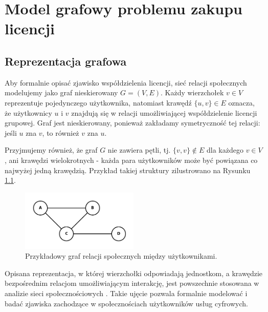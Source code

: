 \chapter{Model grafowy problemu zakupu licencji}

\section{Reprezentacja grafowa}

Aby formalnie opisać zjawisko współdzielenia licencji, sieć relacji społecznych modelujemy jako graf nieskierowany \( G = (V, E) \). Każdy wierzchołek \( v \in V \) reprezentuje pojedynczego użytkownika, natomiast krawędź \( \{u, v\} \in E \) oznacza, że użytkownicy \( u \) i \( v \) znajdują się w relacji umożliwiającej współdzielenie licencji grupowej. Graf jest nieskierowany, ponieważ zakładamy symetryczność tej relacji: jeśli \( u \) zna \( v \), to również \( v \) zna \( u \).

Przyjmujemy również, że graf \( G \) nie zawiera pętli, tj. \( \{v, v\} \notin E \) dla każdego \( v \in V \), ani krawędzi wielokrotnych - każda para użytkowników może być powiązana co najwyżej jedną krawędzią. Przykład takiej struktury zilustrowano na Rysunku \ref{fig:social_graph}.

\begin{figure}[H]
  \centering
  \includegraphics[width=0.5\textwidth]{assets/graphmodelexample.png}
  \caption{Przykładowy graf relacji społecznych między użytkownikami.}
  \label{fig:social_graph}
\end{figure}

Opisana reprezentacja, w której wierzchołki odpowiadają jednostkom, a krawędzie bezpośrednim relacjom umożliwiającym interakcję, jest powszechnie stosowana w analizie sieci społecznościowych \cite{Brandes2004, NETTLETON20131}. Takie ujęcie pozwala formalnie modelować i badać zjawiska zachodzące w społecznościach użytkowników usług cyfrowych.

